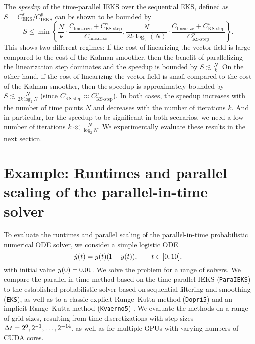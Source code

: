 \documentclass{mimosis}
\begin{document}
The \emph{speedup} of the time-parallel IEKS over the sequential EKS, defined as
\(S = C_\text{EKS}^s / C_\text{IEKS}^p\) can be shown to be bounded by
\begin{equation}
  S \leq \min \left\{
      \frac{N}{k} \cdot
      \frac{C_\text{linearize} + C_\text{KS-step}^s}{C_\text{linearize}},
      \frac{N}{2 k \log_2(N)} \cdot
      \frac{C_\text{linearize} + C_\text{KS-step}^s}{C_\text{KS-step}^p}
      \right\}.
\end{equation}
This shows two different regimes:
If the cost of linearizing the vector field is large compared to the cost of the Kalman smoother, then the benefit of parallelizing the linearization step dominates and the speedup is bounded by
\(S \lesssim \frac{N}{k}\).
On the other hand, if the cost of linearizing the vector field is small compared to the cost of the Kalman smoother,
then the speedup is approximately bounded by
\(S \lesssim \frac{N}{2 k \log_2\!N}\)
(since \(C_\text{KS-step}^s \approx C_\text{KS-step}^p\)).
In both cases, the speedup increases with the number of time points \(N\) and decreases with the number of iterations \(k\).
And in particular, for the speedup to be significant in both scenarios, we need a low number of iterations \(k \ll \frac{N}{\log_2\!N}\).
We experimentally evaluate these results in the next section.
\section{Example: Runtimes and parallel scaling of the parallel-in-time solver}
\label{sec:orgde27651}
To evaluate the runtimes and parallel scaling of the parallel-in-time probabilistic numerical ODE solver, we consider a simple logistic ODE
\begin{equation}
  \dot{\val}(t) = \val(t) \left( 1 - \val(t) \right), \qquad t \in [0, 10],
\end{equation}
with initial value \(y(0) = 0.01\).
We solve the problem for a range of solvers.
We compare the parallel-in-time method based on the time-parallel IEKS (\texttt{ParaIEKS})
to the established probabilistic solver based on sequential filtering and smoothing (\texttt{EKS}),
as well as to a classic explicit Runge--Kutta method (\texttt{Dopri5})
\parencite{dormand1980,shampine1986}
and an implicit Runge--Kutta method (\texttt{Kvaerno5})
\parencite{kvaerno2004}.
We evaluate the methods on a range of grid sizes, resulting from time discretizations with step sizes \({\Delta t} = 2^0, 2^{-1}, \dots, 2^{-14}\), as well as for multiple GPUs with varying numbers of CUDA cores.
\end{document}
